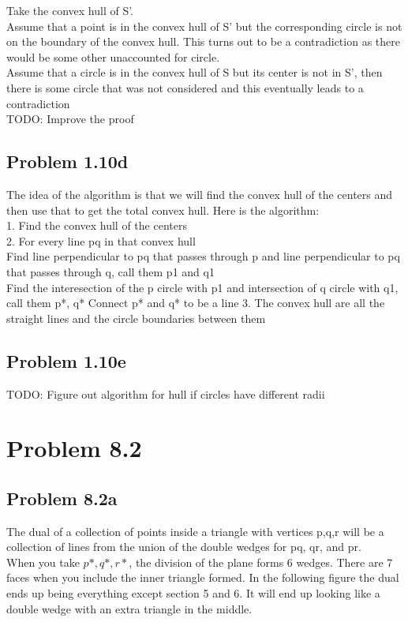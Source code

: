 \documentclass[11pt,psfig]{article}
\begin{document}
Take the convex hull of S'. 
\\
Assume that a point is in the convex hull of S' but the corresponding circle is not on the boundary of the convex hull. This turns out to be a contradiction as there would be some other unaccounted for circle. \\
Assume that a circle is in the convex hull of S but its center is not in S', then there is some circle that was not considered and this eventually leads to a contradiction
\\
TODO: Improve the proof

\subsection*{Problem 1.10d}

The idea of the algorithm is that we will find the convex hull of the centers and then use that to get the total convex hull. Here is the algorithm:\\
1. Find the convex hull of the centers\\
2. For every line pq in that convex hull\\
			Find line perpendicular to pq that passes through p and line perpendicular to pq that passes through q, call them p1 and q1\\
			Find the interesection of the p circle with p1 and intersection of q circle with q1, call them p*, q*
			Connect p* and q* to be a line
3. The convex hull are all the straight lines and the circle boundaries between them

\subsection*{Problem 1.10e}

TODO: Figure out algorithm for hull if circles have different radii


\section*{Problem 8.2}

\subsection*{Problem 8.2a}

The dual of a collection of points inside a triangle with vertices p,q,r will be a collection of lines from the union of the double wedges for pq, qr, and pr. 
\\
When you take $p*, q*, r*$, the division of the plane forms 6 wedges. There are 7 faces when you include the inner triangle formed. In the following figure the dual ends up being everything except section 5 and 6. It will end up looking like a double wedge with an extra triangle in the middle. 
\end{document}
